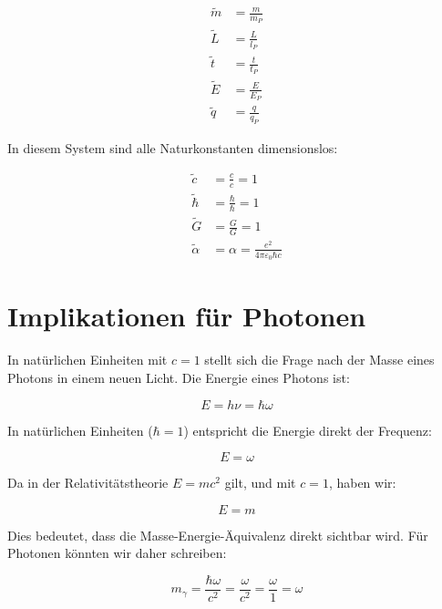 \documentclass{article}
\begin{document}
	\begin{align}
		\tilde{m} &= \frac{m}{m_P} \\
		\tilde{L} &= \frac{L}{l_P} \\
		\tilde{t} &= \frac{t}{t_P} \\
		\tilde{E} &= \frac{E}{E_P} \\
		\tilde{q} &= \frac{q}{q_P}
	\end{align}
	
	In diesem System sind alle Naturkonstanten dimensionslos:
	
	\begin{align}
		\tilde{c} &= \frac{c}{c} = 1 \\
		\tilde{\hbar} &= \frac{\hbar}{\hbar} = 1 \\
		\tilde{G} &= \frac{G}{G} = 1 \\
		\tilde{\alpha} &= \alpha = \frac{e^2}{4\pi\varepsilon_0\hbar c}
	\end{align}
	
	\section{Implikationen für Photonen}
	
	In natürlichen Einheiten mit $c = 1$ stellt sich die Frage nach der Masse eines Photons in einem neuen Licht. Die Energie eines Photons ist:
	
	\begin{equation}
		E = h\nu = \hbar\omega
	\end{equation}
	
	In natürlichen Einheiten ($\hbar = 1$) entspricht die Energie direkt der Frequenz:
	
	\begin{equation}
		E = \omega
	\end{equation}
	
	Da in der Relativitätstheorie $E = mc^2$ gilt, und mit $c = 1$, haben wir:
	
	\begin{equation}
		E = m
	\end{equation}
	
	Dies bedeutet, dass die Masse-Energie-Äquivalenz direkt sichtbar wird. Für Photonen könnten wir daher schreiben:
	
	\begin{equation}
		m_{\gamma} = \frac{\hbar\omega}{c^2} = \frac{\omega}{c^2} = \frac{\omega}{1} = \omega
	\end{equation}
	
\end{document}
